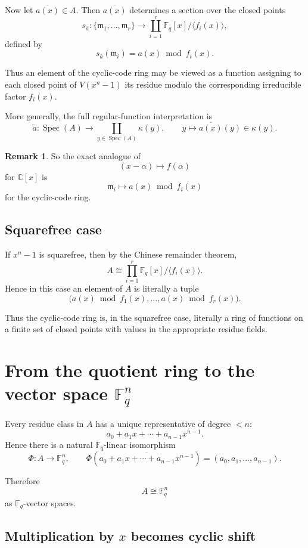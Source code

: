 \documentclass[11pt]{article}
\theoremstyle{definition}
\newtheorem{remark}[theorem]{Remark}
\newcommand{\C}{\mathbb{C}}
\newcommand{\F}{\mathbb{F}}
\newcommand{\Spec}{\operatorname{Spec}}
\newcommand{\kk}[1]{\kappa\!\left(#1\right)}
\newcommand{\ideal}[1]{\langle #1\rangle}
\newcommand{\ol}[1]{\overline{#1}}
\begin{document}
	Now let \(\ol{a(x)}\in A\). Then \(\ol{a(x)}\) determines a section over the closed points
	\[
	s_{\ol{a}}:\{\mathfrak m_1,\dots,\mathfrak m_r\}
	\longrightarrow
	\coprod_{i=1}^r \F_q[x]/\ideal{f_i(x)},
	\]
	defined by
	\[
	s_{\ol{a}}(\mathfrak m_i)=a(x)\bmod f_i(x).
	\]
	
	Thus an element of the cyclic-code ring may be viewed as a function assigning to each closed point of \(V(x^n-1)\) its residue modulo the corresponding irreducible factor \(f_i(x)\).
	
	More generally, the full regular-function interpretation is
	\[
	\widetilde a:\Spec(A)\longrightarrow \coprod_{y\in \Spec(A)}\kk{y},
	\qquad
	y\longmapsto \ol{a(x)}(y)\in \kk{y}.
	\]
	
	\begin{remark}
		So the exact analogue of
		\[
		(x-\alpha)\longmapsto f(\alpha)
		\]
		for \(\C[x]\) is
		\[
		\mathfrak m_i\longmapsto a(x)\bmod f_i(x)
		\]
		for the cyclic-code ring.
	\end{remark}
	
	\subsection{Squarefree case}
	
	If \(x^n-1\) is squarefree, then by the Chinese remainder theorem,
	\[
	A\cong \prod_{i=1}^r \F_q[x]/\ideal{f_i(x)}.
	\]
	Hence in this case an element of \(A\) is literally a tuple
	\[
	\bigl(a(x)\bmod f_1(x),\dots,a(x)\bmod f_r(x)\bigr).
	\]
	
	Thus the cyclic-code ring is, in the squarefree case, literally a ring of functions on a finite set of closed points with values in the appropriate residue fields.
	
	\section{From the quotient ring to the vector space \(\F_q^n\)}
	
	Every residue class in \(A\) has a unique representative of degree \(<n\):
	\[
	a_0+a_1x+\cdots+a_{n-1}x^{n-1}.
	\]
	Hence there is a natural \(\F_q\)-linear isomorphism
	\[
	\Phi:A\to \F_q^n,
	\qquad
	\Phi\!\left(\ol{a_0+a_1x+\cdots+a_{n-1}x^{n-1}}\right)
	=
	(a_0,a_1,\dots,a_{n-1}).
	\]
	
	Therefore
	\[
	A\cong \F_q^n
	\]
	as \(\F_q\)-vector spaces.
	
	\subsection{Multiplication by \(x\) becomes cyclic shift}
	
\end{document}
